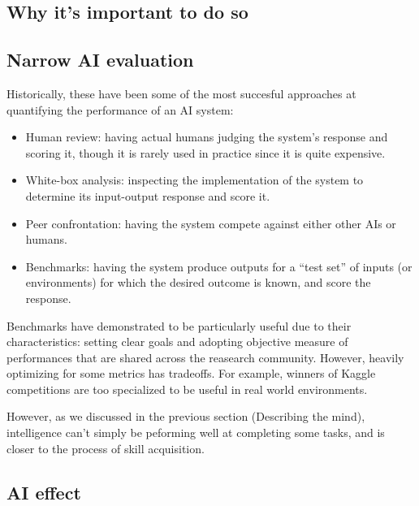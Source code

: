     \subsection{Why it's important to do so}

    \subsection{Narrow AI evaluation}
        \begin{flushleft}
            Historically, these have been some of the most succesful approaches at quantifying the performance of an AI system:
        \end{flushleft}

        \begin{itemize}
            \item Human review: having actual humans judging the system's response and scoring it, though it is rarely used in practice since it is quite expensive.
            \item White-box analysis: inspecting the implementation of the system to determine its input-output response and score it.
            \item Peer confrontation: having the system compete against either other AIs or humans.
            \item Benchmarks: having the system produce outputs for a “test set” of inputs (or environments) for which the desired outcome is known, and score the response.
        \end{itemize}

        \begin{flushleft}
            Benchmarks have demonstrated to be particularly useful due to their characteristics: setting clear goals and adopting objective measure of performances that are shared across the reasearch community. However, heavily optimizing for some metrics has tradeoffs. For example, winners of Kaggle competitions are too specialized to be useful in real world environments.
        \end{flushleft}

        \begin{flushleft}
            However, as we discussed in the previous section (Describing the mind), intelligence can't simply be peforming well at completing some tasks, and is closer to the process of skill acquisition. 
        \end{flushleft}
    
    \subsection{AI effect}
